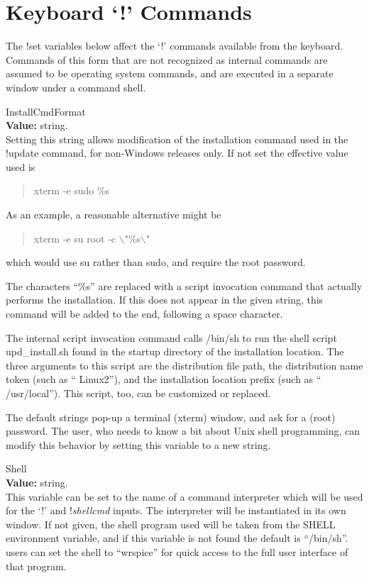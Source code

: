 \section{Keyboard `!' Commands}

The {\cb !set} variables below affect the `!' commands available from
the keyboard.  Commands of this form that are not recognized as
internal commands are assumed to be operating system commands, and are
executed in a separate window under a command shell.

\begin{description}
\item{\et InstallCmdFormat}\\
{\bf Value:} string.\\
Setting this string allows modification of the installation command
used in the {\cb !update} command, for non-Windows releases only.  If
not set the effective value used is
\begin{quote}
{\vt xterm -e sudo \%s}
\end{quote}

As an example, a reasonable alternative might be
\begin{quote}
{\vt xterm -e su root -c $\backslash$"\%s$\backslash$"}
\end{quote}
which would use {\vt su} rather than {\vt sudo}, and require the
root password.

The characters ``{\vt \%s}'' are replaced with a script invocation
command that actually performs the installation.  If this does not
appear in the given string, this command will be added to the end,
following a space character.

The internal script invocation command calls {\vt /bin/sh} to run the
shell script {\vt upd\_install.sh} found in the startup directory of
the installation location.  The three arguments to this script are the
distribution file path, the distribution name token (such as ``{\vt
Linux2}''), and the installation location prefix (such as ``{\vt
/usr/local}'').  This script, too, can be customized or replaced.

The default strings pop-up a terminal (xterm) window, and ask for a
(root) password.  The user, who needs to know a bit about Unix shell
programming, can modify this behavior by setting this variable to a
new string.

\item{\et Shell}\\
{\bf Value:} string.\\
This variable can be set to the name of a command interpreter which
will be used for the `!' and !{\it shellcmd} inputs.  The interpreter
will be instantiated in its own window.  If not given, the shell
program used will be taken from the {\et SHELL} environment variable,
and if this variable is not found the default is ``{\vt /bin/sh}''. 
{\WRspice} users can set the shell to ``{\vt wrspice}'' for quick
access to the full user interface of that program.


\end{description}
